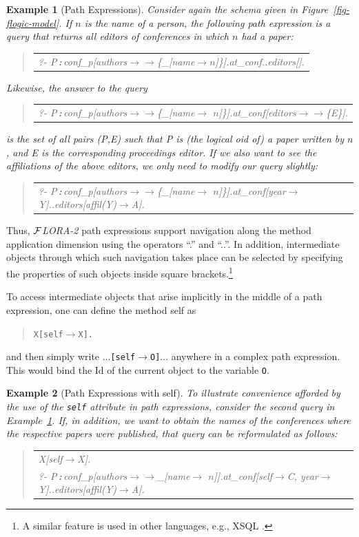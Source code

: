 \documentclass[11pt]{article}
\newtheorem{example}{Example}[section]
\newenvironment{qrules}{\begin{quote}\tt\begin{tabular}[t]{l}}%
{\end{tabular}\end{quote}}
\newcommand{\isa}{\,{\bf{:}}\,}
\newcommand{\fd}{\ensuremath{{\rightarrow}}}                   %
\newcommand{\mvd}{\ensuremath{{\rightarrow\!\!\!\!\rightarrow}}}  %
\newcommand{\anon}{\_}
\newcommand{\FLORA}{{\mbox{${\cal F}${\small\it LORA}\rm\emph{-2}}}\xspace}
\begin{document}
\begin{example}[Path Expressions]\label{Ex:PathExpr}
  \rm Consider again the schema given in Figure~\ref{fig-flogic-model}.  If
  $n$ is the name of a person, the following path expression is a query
  that returns all editors of conferences in which $n$ had a paper:
  \begin{qrules}
    ?- P\isa conf\_p[authors\mvd\{\anon [name\fd $n$]\}].at\_conf..editors[].
  \end{qrules}
  Likewise, the answer to the query
  \begin{qrules}
    ?- P\isa conf\_p[authors\mvd\{\anon [name\fd
    $n$]\}].at\_conf[editors\mvd\{E\}].
  \end{qrules}
  is the set of all pairs (\textsf{P},\textsf{E}) such that \textsf{P} is
  (the logical oid of) a paper written by $n$, and \textsf{E} is the
  corresponding proceedings editor.  If we also want to see the
  affiliations of the above editors, we only need to modify our query
  slightly:
  \begin{qrules}
    ?- P\isa conf\_p[authors\mvd\{\anon [name\fd
    $n$]\}].at\_conf[year\fd Y]..editors[affil(Y)\fd A].
  \end{qrules}
\end{example}
Thus, \FLORA path expressions support navigation 
along the method application dimension using the operators
``.''  and
``..''. In addition, intermediate objects through which such navigation
takes place can be selected by specifying the properties of such objects
inside square brackets.\footnote{
  A similar feature is used in other languages, e.g., XSQL \cite{xsql-92}.
  }

To access intermediate objects that arise implicitly in the middle
of a path expression, one can define the method \textsf{self} as
\begin{quote}
  {\tt X[self{\fd}X].} 
\end{quote}
and then simply write $\dots${\tt [self{\fd}O]}$\dots$ anywhere in a
complex path expression. This would bind the Id of the current object to
the variable {\tt O}.

\begin{example}[Path Expressions with \textsf{self}]\label{ex-path-self}
  \rm{
    To illustrate convenience afforded by the use of the {\tt self}
    attribute in path expressions, consider the second query in
    Example~\ref{Ex:PathExpr}. If, in addition, we want to obtain the names
    of the conferences where the respective papers were published, that
    query can be reformulated as follows:
    }
  \begin{qrules}
    X[self\fd X].\\
    ?- P\isa conf\_p[authors\mvd\anon [name\fd
    $n$]].at\_conf[self\fd C, year\fd Y]..editors[affil(Y)\fd A]. 
  \end{qrules}
\end{example}
\end{document}
